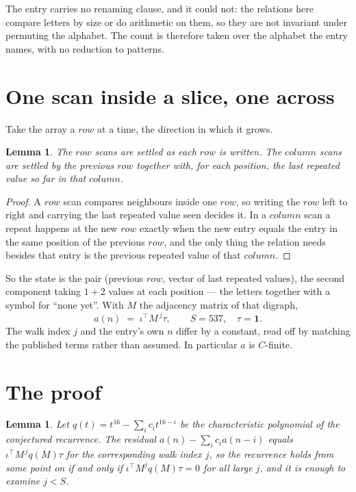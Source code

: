 \documentclass[11pt,a4paper]{article}
\theoremstyle{plain}
\newtheorem{lemma}[theorem]{Lemma}
\theoremstyle{definition}
\begin{document}
The entry carries no renaming clause, and it could not: the relations here compare letters by
size or do arithmetic on them, so they are not invariant under permuting the alphabet. The
count is therefore taken over the alphabet the entry names, with no reduction to patterns.

\section{One scan inside a slice, one across}

Take the array a $row$ at a time, the direction in which it grows.

\begin{lemma}\label{lem:state}
The $row$ scans are settled as each $row$ is written. The $column$ scans are
settled by the previous $row$ together with, for each position, the last repeated value
so far in that $column$.
\end{lemma}

\begin{proof}
A $row$ scan compares neighbours inside one $row$, so writing the
$row$ left to right and carrying the last repeated value seen decides it. In a
$column$ scan a repeat happens at the new $row$ exactly when the new entry equals the
entry in the same position of the previous $row$, and the only thing the relation needs
besides that entry is the previous repeated value of that $column$.
\end{proof}

So the state is the pair (previous $row$, vector of last repeated values), the second
component taking $1+2$ values at each position --- the letters together with a symbol for
``none yet''. With $M$ the adjacency matrix of that digraph,
\[
a(n)\;=\;\iota^{\!\top}M^{\,j}\tau ,\qquad S=537,\quad\tau=\mathbf{1} .
\]
The walk index $j$ and the entry's own $n$ differ by a constant, read off by matching the
published terms rather than assumed. In particular $a$ is $C$-finite.

\section{The proof}

\begin{lemma}\label{lem:crit}
Let $q(t)=t^{16}-\sum_i c_it^{16-i}$ be the characteristic polynomial of the
conjectured recurrence. The residual $a(n)-\sum_ic_ia(n-i)$ equals
$\iota^{\!\top}M^{\,j}q(M)\tau$ for the corresponding walk index $j$, so the recurrence
holds from some point on if and only if $\iota^{\!\top}M^{j}q(M)\tau=0$ for all large $j$,
and it is enough to examine $j<S$.
\end{lemma}
\end{document}
